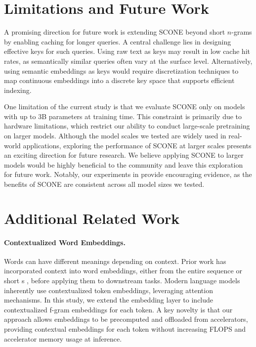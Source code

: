 \section{Limitations and Future Work}\label{sec:limitations}

A promising direction for future work is extending SCONE beyond short $n$-grams by enabling caching for longer queries. A central challenge lies in designing effective keys for such queries. Using raw text as keys may result in low cache hit rates, as semantically similar queries often vary at the surface level. Alternatively, using semantic embeddings as keys would require discretization techniques to map continuous embeddings into a discrete key space that supports efficient indexing.

One limitation of the current study is that we evaluate SCONE only on models with up to 3B parameters at training time. This constraint is primarily due to hardware limitations, which restrict our ability to conduct large-scale pretraining on larger models. Although the model scales we tested are widely used in real-world applications, exploring the performance of SCONE at larger scales presents an exciting direction for future research. We believe applying SCONE to larger models would be highly beneficial to the community and leave this exploration for future work. Notably, our experiments in  provide encouraging evidence, as the benefits of SCONE are consistent across all model sizes we tested.

\section{Additional Related Work}\label{sec:add_related_work}

\paragraph{Contextualized Word Embeddings.} Words can have different meanings depending on context. Prior work has incorporated context into word embeddings, either from the entire sequence \citep{mccann2017learned,peters2018deep} or short s \citep{gupta2019better}, before applying them to downstream tasks. Modern language models inherently use contextualized token embeddings, leveraging attention mechanisms. In this study, we extend the embedding layer to include contextualized f-gram embeddings for each token. A key novelty is that our approach allows embeddings to be precomputed and offloaded from accelerators, providing contextual embeddings for each token without increasing FLOPS and accelerator memory usage at inference.


